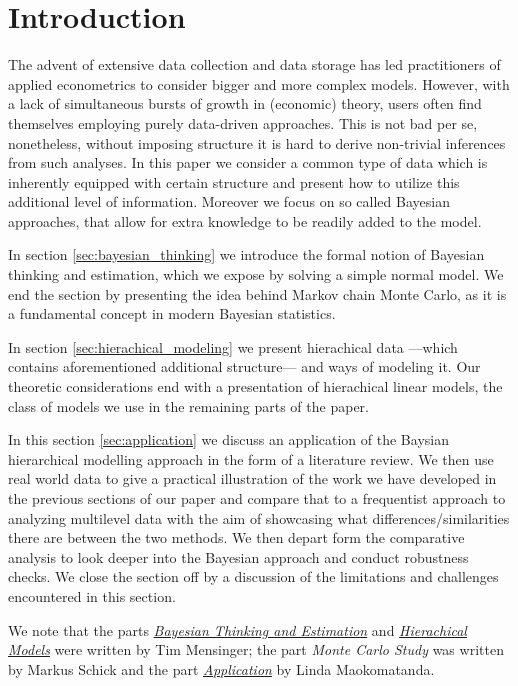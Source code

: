 \section{Introduction}

The advent of extensive data collection and data storage has led practitioners of applied econometrics to consider bigger and more complex models.
However, with a lack of simultaneous bursts of growth in (economic) theory, users often find themselves employing purely data-driven approaches.
This is not bad per se, nonetheless, without imposing structure it is hard to derive non-trivial inferences from such analyses.
In this paper we consider a common type of data which is inherently equipped with certain structure and present how to utilize this additional level of information.
Moreover we focus on so called Bayesian approaches, that allow for extra knowledge to be readily added to the model.

In section \ref{sec:bayesian_thinking} we introduce the formal notion of Bayesian thinking and estimation, which we expose by solving a simple normal model.
We end the section by presenting the idea behind Markov chain Monte Carlo, as it is a fundamental concept in modern Bayesian statistics.

In section \ref{sec:hierachical_modeling} we present hierachical data ---which contains aforementioned additional structure--- and ways of modeling it.
Our theoretic considerations end with a presentation of hierachical linear models, the class of models we use in the remaining parts of the paper.

In this section \ref{sec:application} we discuss an application of the Baysian hierarchical modelling approach in the form of a literature review. We then use real world data to give a practical illustration of the work we have developed in the previous sections of our paper and compare that to a frequentist approach to analyzing multilevel data with the aim of showcasing what differences/similarities there are between the two methods. We then depart form the comparative analysis to look deeper into the Bayesian approach and conduct robustness checks. We close the section off by a discussion of the limitations and challenges encountered in this section.

We note that the parts \hyperref[sec:bayesian_thinking]{\emph{Bayesian Thinking and Estimation}} and \hyperref[sec:hierachical_modeling]{\emph{Hierachical Models}} were written by Tim Mensinger; the part \emph{Monte Carlo Study} was written by Markus Schick and the part \hyperref[sec:application]{\emph{Application}} by Linda Maokomatanda.
